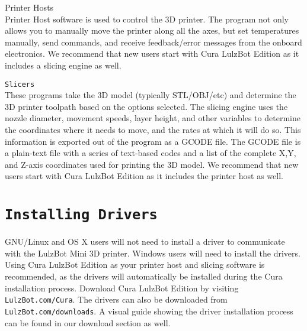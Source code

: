 \begin{description}
\item{Printer Hosts} \hfill \\
Printer Host software is used to control the 3D printer. The program not only allows you to manually move the printer along all the axes, but set temperatures manually, send commands, and receive feedback/error messages from the onboard electronics. We recommend that new users start with Cura LulzBot Edition as it includes a slicing engine as well.

\item{\texttt{Slicers}} \hfill \\
These programs take the 3D model (typically STL/OBJ/etc) and determine the 3D printer toolpath based on the options selected. The slicing engine uses the nozzle diameter, movement speeds, layer height, and other variables to determine the coordinates where it needs to move, and the rates at which it will do so. This information is exported out of the program as a GCODE file. The GCODE file is a plain-text file with a series of text-based codes and a list of the complete X,Y, and Z-axis coordinates used for printing the 3D model. We recommend that new users start with Cura LulzBot Edition as it includes the printer host as well.


\end{description}

\section{\texttt{Installing Drivers}}
GNU/Linux and OS X users will not need to install a driver to communicate with the LulzBot Mini 3D printer. Windows users will need to install the drivers. Using Cura LulzBot Edition as your printer host and slicing software is recommended, as the drivers will automatically be installed during the Cura installation process. Download Cura LulzBot Edition by visiting \texttt{LulzBot.com/Cura}. The drivers can also be downloaded from \texttt{LulzBot.com/downloads}. A visual guide showing the driver installation process can be found in our download section as well.



